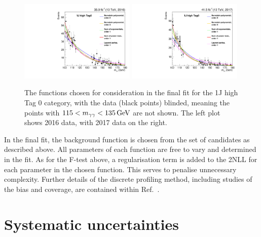 \begin{figure}[hptb]
  \centering
  \includegraphics[width=0.49\textwidth]{Figures/SigBkg/allPdfs_RECO_1J_PTH_120_200_Tag0_2016.pdf}
  \includegraphics[width=0.49\textwidth]{Figures/SigBkg/allPdfs_RECO_1J_PTH_120_200_Tag0_2017.pdf}
  \caption[Candidate background functions considered for the 1J high Tag 0 category.]
  {
    The functions chosen for consideration in the final fit for the 1J high Tag 0 category, 
    with the data (black points) blinded, 
    meaning the points with $115 < m_{\gamma\gamma} < \SI{135}{GeV}$ are not shown.
    The left plot shows 2016 data, with 2017 data on the right.
  }
  \label{fig:sigbkg_functions}
\end{figure}

In the final fit, the background function is chosen from the set of candidates as described above.
All parameters of each function are free to vary and determined in the fit.
As for the F-test above, 
a regularisation term is added to the 2NLL for each parameter in the chosen function.
This serves to penalise unnecessary complexity.
Further details of the discrete profiling method, 
including studies of the bias and coverage,
are contained within Ref.~\cite{Envelope}.

\section{Systematic uncertainties}

